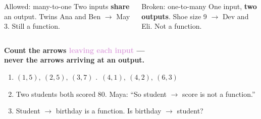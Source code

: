 \documentclass[aspectratio=169, 11pt]{beamer}
\begin{document}
\begin{frame}[t, plain]

  \begin{columns}[T]
      \begin{block}{Allowed: many-to-one}
        Two inputs \textbf{share} an output. Twins Ana and Ben \(\to\) May 3.
        Still a function.
      \end{block}
      \begin{block}{Broken: one-to-many}
        One input, \textbf{two outputs}. Shoe size 9 \(\to\) Dev and Eli.
        Not a function.
      \end{block}
  \end{columns}

  \medskip
  \begin{center}
    \Large\textbf{Count the arrows \textcolor{plum}{leaving each input} ---\\
    never the arrows arriving at an output.}
  \end{center}

  \begin{enumerate}\setlength{\itemsep}{2pt}
    \setcounter{enumi}{8}
    \item \((1, 5),\ (2, 5),\ (3, 7)\) .\ \((4, 1),\ (4, 2),\ (6, 3)\)
    \setcounter{enumi}{10}
    \item Two students both scored 80. Maya: ``So student \(\to\) score is not a function.''
    \item Student \(\to\) birthday is a function. Is birthday \(\to\) student?
  \end{enumerate}
\end{frame}
\end{document}
